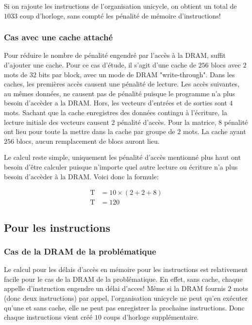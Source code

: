 \documentclass[a11paper]{article}
\begin{document}
Si on rajoute les instructions de l'organisation unicycle, on obtient un
total de $1033$ coup d'horloge, sans compté les pénalité de mémoire
d'instructions!

\subsubsection{Cas avec une cache attaché}

Pour réduire le nombre de pénalité engendré par l'accès à la DRAM, suffit
d'ajouter une cache. Pour ce cas d'étude, il s'agit d'une cache de $256$ blocs
avec $2$ mots de $32$ bits par block, avec un mode de DRAM "write-through".
Dans les caches, les premières accès causent une pénalité de lecture. Les accès
suivantes, au mêmes données, ne causent pas de pénalité puisque le programme n'a
plus besoin d'accèder a la DRAM. Hors, les vecteurs d'entrées et de sorties sont
$4$ mots. Sachant que la cache enregistres des données contingu à l'écriture, la
lecture initiale des vecteurs causent $2$ pénalité d'accès.
Pour la matrice, $8$ pénalité ont lieu pour toute la mettre dans la cache par
groupe de $2$ mots. La cache ayant $256$ blocs, aucun remplacement de blocs
auront lieu.

Le calcul reste simple, uniquement les pénalité d'accès mentionné plus haut
ont besoin d'être calculer puisque n'importe quel autre lecture ou écriture
n'a plus besoin d'accèder à la DRAM. Voici donc la formule:

\begin{align}
  \text{T} &= 10\times(2+2+8) \\
  \text{T} &= 120
\end{align}


\subsection{Pour les instructions}
\subsubsection{Cas de la DRAM de la problématique}

Le calcul pour les délais d'accès en mémoire pour les instructions est
relativement facile pour le cas de la DRAM de la problématique. En effet,
sans cache, chaque appelle d'instruction engendre un délai d'acces! Même si
la DRAM fournis $2$ mots (donc deux instructions) par appel, l'organisation
unicycle ne peut qu'en exécuter qu'une et sans cache, elle ne peut pas
enregistrer la prochaine instructions. Donc chaque instructions vient créé $10$
coups d'horloge supplémentaire.
\end{document}
